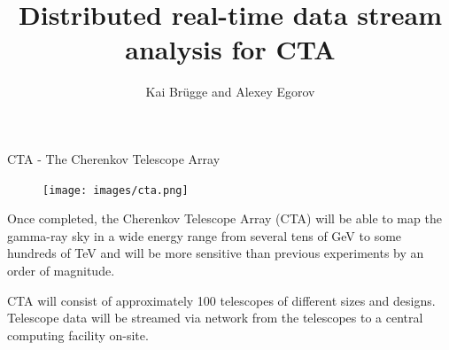 

\title{Distributed real-time data stream analysis for CTA}
\author{Kai Brügge and Alexey Egorov}
\usetikzlibrary{calc}
\usetikzlibrary{shadows.blur}

%

\begin{multicols}{2}
    \begin{block}[equal height group=B]{CTA - The Cherenkov Telescope Array}%
      \begin{multicols}{2}
        \begin{figure}
          \texttt{[image: images/cta.png]}\\
        \end{figure}
        \columnbreak
        Once completed, the  Cherenkov Telescope Array (CTA)  will be able to map the gamma-ray sky
        in a wide energy range from several tens of GeV to some hundreds of TeV and will be more sensitive
        than previous experiments by an order of magnitude.

        CTA will consist of approximately 100 telescopes of different sizes and designs.
        Telescope data will be streamed via network from the telescopes to a central computing facility
        on-site.
      \end{multicols}
    \end{block}%


\end{multicols}
